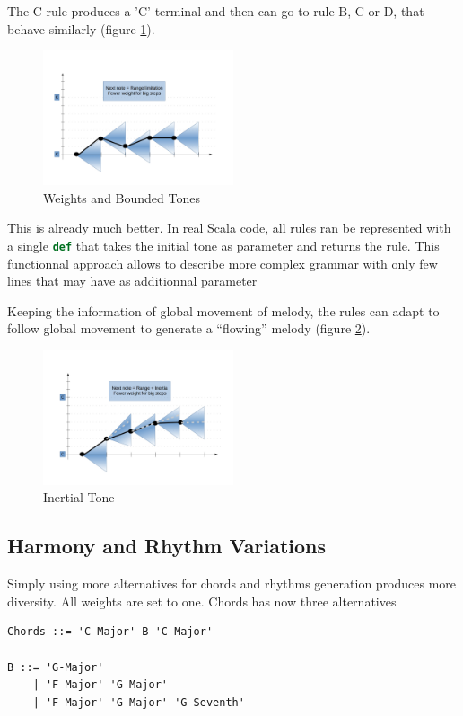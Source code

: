 \documentclass[twocolumn, 11pt]{article}
\newcommand{\code}[1]{\lstinline[language=Scala,columns=fixed,basicstyle=\ttfamily]|#1|}
\begin{document}
The C-rule produces a 'C' terminal and then can go to rule B, C or D, that behave similarly (figure \ref{fig:bound}).

\begin{figure}[h]
  \centering
  \includegraphics[width=0.5\textwidth]{bounded}
  \caption{Weights and Bounded Tones}
  \label{fig:bound}
\end{figure}


This is already much better.
In real Scala code, all rules ran be represented with a single \code{def} that takes the initial tone as parameter and returns the rule.
This functionnal approach allows to describe more complex grammar with only few lines that may have as additionnal parameter

Keeping the information of global movement of melody, the rules can adapt to follow global movement to generate a ``flowing'' melody (figure \ref{fig:inertial}).

\begin{figure}[h]
  \centering
  \includegraphics[width=0.5\textwidth]{inertial}
  \caption{Inertial Tone}
  \label{fig:inertial}
\end{figure}

\subsection{Harmony and Rhythm Variations}

Simply using more alternatives for chords and rhythms generation produces more diversity. All weights are set to one.
Chords has now three alternatives
\begin{lstlisting}
Chords ::= 'C-Major' B 'C-Major'

B ::= 'G-Major'
    | 'F-Major' 'G-Major'
    | 'F-Major' 'G-Major' 'G-Seventh'           
\end{lstlisting}
\end{document}
